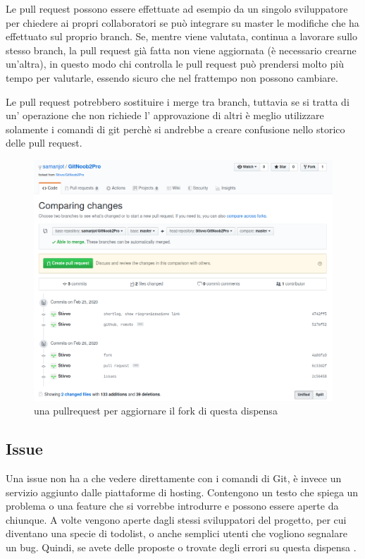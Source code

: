 \documentclass{article}
\begin{document}
Le pull request possono essere effettuate ad esempio da un singolo sviluppatore
per chiedere ai propri collaboratori se può integrare su master le modifiche che ha
effettuato sul proprio branch. Se, mentre viene valutata, continua a lavorare
sullo stesso branch, la pull request già fatta non viene aggiornata
(è necessario crearne un'altra), in questo modo chi controlla le pull
request può prendersi molto più tempo per valutarle, essendo sicuro che nel
frattempo non possono cambiare.

Le pull request potrebbero sostituire i merge tra branch, tuttavia se si
tratta di un' operazione che non richiede l' approvazione di altri è meglio
utilizzare solamente i comandi di git perchè si andrebbe a creare confusione 
nello storico delle pull request.

\begin{figure}
\includegraphics[width=6in]{img/pullRequest.png}
\centering
\caption{una pullrequest per aggiornare il fork di questa dispensa 
}
\end{figure}

\subsection{Issue\label{issue}}
Una issue non ha a che vedere direttamente con i comandi di Git, è invece un
servizio aggiunto dalle piattaforme di hosting. Contengono un testo che spiega
un problema o una feature che si vorrebbe introdurre e possono essere aperte da
chiunque.
A volte vengono aperte dagli stessi sviluppatori del progetto, per cui diventano
una specie di todolist, o anche semplici utenti che vogliono segnalare un bug.
Quindi, se avete delle proposte o trovate degli errori su questa dispensa
.
\end{document}
